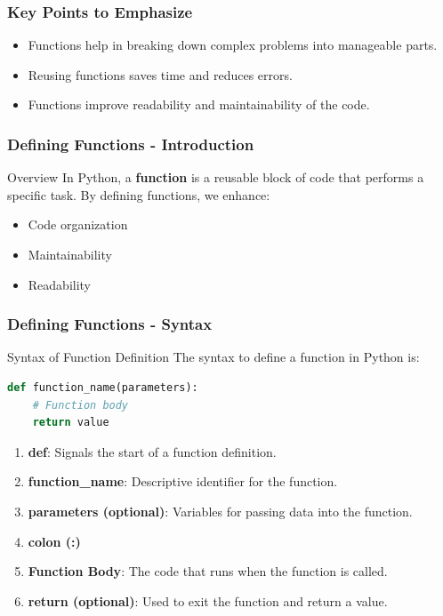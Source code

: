 \documentclass{beamer}
\begin{document}
\begin{frame}[fragile]
    \frametitle{Key Points to Emphasize}
    \begin{itemize}
        \item Functions help in breaking down complex problems into manageable parts.
        \item Reusing functions saves time and reduces errors.
        \item Functions improve readability and maintainability of the code.
    \end{itemize}
\end{frame}

\begin{frame}[fragile]
    \frametitle{Defining Functions - Introduction}
    \begin{block}{Overview}
        In Python, a \textbf{function} is a reusable block of code that performs a specific task. 
        By defining functions, we enhance:
        \begin{itemize}
            \item Code organization
            \item Maintainability
            \item Readability
        \end{itemize}
    \end{block}
\end{frame}

\begin{frame}[fragile]
    \frametitle{Defining Functions - Syntax}
    \begin{block}{Syntax of Function Definition}
        The syntax to define a function in Python is:
        \begin{lstlisting}[language=Python]
def function_name(parameters):
    # Function body
    return value
        \end{lstlisting}
    \end{block}
    
    \begin{enumerate}
        \item \textbf{def}: Signals the start of a function definition.
        \item \textbf{function\_name}: Descriptive identifier for the function.
        \item \textbf{parameters (optional)}: Variables for passing data into the function.
        \item \textbf{colon (:)}
        \item \textbf{Function Body}: The code that runs when the function is called.
        \item \textbf{return (optional)}: Used to exit the function and return a value.
    \end{enumerate}
\end{frame}
\end{document}
